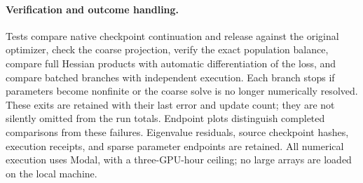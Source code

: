 \paragraph{Verification and outcome handling.}
Tests compare native checkpoint continuation and release against the original
optimizer, check the coarse projection, verify the exact population balance,
compare full Hessian products with automatic differentiation of the loss,
and compare batched branches with independent execution. Each branch stops
if parameters become nonfinite or the coarse solve is no longer numerically
resolved. These exits are retained with their last error and update count;
they are not silently omitted from the run totals. Endpoint plots distinguish
completed comparisons from these failures. Eigenvalue residuals, source
checkpoint hashes, execution receipts, and sparse parameter endpoints are
retained. All numerical execution uses Modal, with a three-GPU-hour ceiling;
no large arrays are loaded on the local machine.
